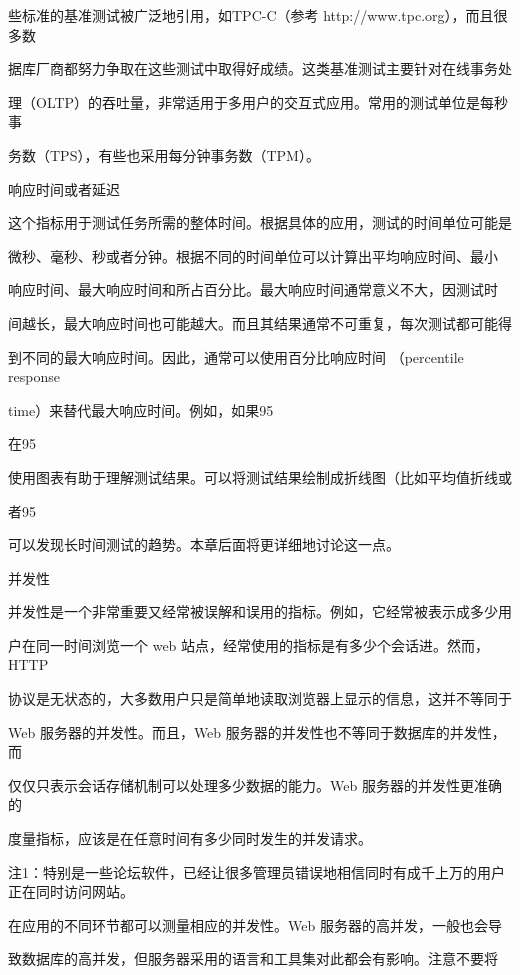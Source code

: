 些标准的基准测试被广泛地引用，如TPC-C（参考 http://www.tpc.org），而且很多数

据库厂商都努力争取在这些测试中取得好成绩。这类基准测试主要针对在线事务处

理（OLTP）的吞吐量，非常适用于多用户的交互式应用。常用的测试单位是每秒事

务数（TPS），有些也采用每分钟事务数（TPM）。

响应时间或者延迟

这个指标用于测试任务所需的整体时间。根据具体的应用，测试的时间单位可能是

微秒、毫秒、秒或者分钟。根据不同的时间单位可以计算出平均响应时间、最小

响应时间、最大响应时间和所占百分比。最大响应时间通常意义不大，因测试时

间越长，最大响应时间也可能越大。而且其结果通常不可重复，每次测试都可能得

到不同的最大响应时间。因此，通常可以使用百分比响应时间 （percentile response

time）来替代最大响应时间。例如，如果95%

在95%

使用图表有助于理解测试结果。可以将测试结果绘制成折线图（比如平均值折线或

者95%

可以发现长时间测试的趋势。本章后面将更详细地讨论这一点。

并发性

并发性是一个非常重要又经常被误解和误用的指标。例如，它经常被表示成多少用

户在同一时间浏览一个 web 站点，经常使用的指标是有多少个会话进。然而，HTTP

协议是无状态的，大多数用户只是简单地读取浏览器上显示的信息，这并不等同于

Web 服务器的并发性。而且，Web 服务器的并发性也不等同于数据库的并发性，而

仅仅只表示会话存储机制可以处理多少数据的能力。Web 服务器的并发性更准确的

度量指标，应该是在任意时间有多少同时发生的并发请求。

注1：特别是一些论坛软件，已经让很多管理员错误地相信同时有成千上万的用户正在同时访问网站。

在应用的不同环节都可以测量相应的并发性。Web 服务器的高并发，一般也会导

致数据库的高并发，但服务器采用的语言和工具集对此都会有影响。注意不要将

